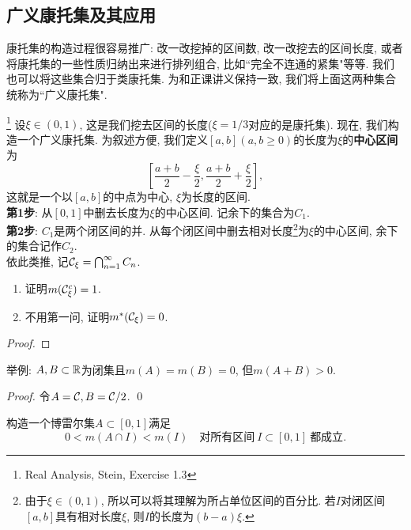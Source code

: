 \subsection{广义康托集及其应用}
康托集的构造过程很容易推广: 改一改挖掉的区间数, 改一改挖去的区间长度,
或者将康托集的一些性质归纳出来进行排列组合, 比如``完全不连通的紧集"等等. 我们也可以将这些集合归于类康托集. 为和正课讲义保持一致, 我们将上面这两种集合统称为``广义康托集". 

\begin{example}\footnote{Real Analysis, Stein, Exercise 1.3}
    设$\xi \in (0, 1)$, 这是我们挖去区间的长度($\xi = 1/3$对应的是康托集). 现在, 我们构造一个广义康托集. 为叙述方便, 我们定义$[a,b](a,b \geq 0)$的长度为$\xi$的\textbf{中心区间}为$$\displaystyle{\left[\frac{a+b}{2}-\frac{\xi}{2}, \frac{a+b}{2} + \frac{\xi}{2} \right]}, $$ 这就是一个以$[a,b]$的中点为中心, $\xi$为长度的区间.  \\
    \textbf{第1步}: 从$[0,1]$中删去长度为$\xi$的中心区间. 记余下的集合为$C_1$. \\
    \textbf{第2步}: $C_1$是两个闭区间的并. 从每个闭区间中删去相对长度\footnote{由于$\xi \in (0,1)$, 所以可以将其理解为所占单位区间的百分比. 若$I$对闭区间$[a,b]$具有相对长度$\xi$, 则$I$的长度为$(b-a)\xi$. }为$\xi$的中心区间, 余下的集合记作$C_2$. \\
    依此类推, 记$\mathcal{C}_\xi = \bigcap_{n=1}^{\infty}C_n$.
    \begin{enumerate}
    \item 证明$m(\mathcal{C}_\xi^c) = 1$.
    \item 不用第一问, 证明$m^*(\mathcal{C}_\xi) = 0$. 
    \end{enumerate}
\end{example}
\begin{proof}
    
\end{proof}
\begin{example}
    
\end{example}


\begin{example} %
    举例: $A, B \subset \mathbb{R}$为闭集且$m(A)=m(B)=0$, 但$m(A+B)>0$.
\end{example}
\begin{proof}
    令$A = \mathcal{C}, B = \mathcal{C} / 2$. 
    \qed
\end{proof}


\begin{example}
    构造一个博雷尔集$A \subset [0,1]$满足
    $$ 0<m(A \cap I)<m(I) \quad \text{对所有区间}~I \subset [0,1]~\text{都成立}. $$
\end{example}

